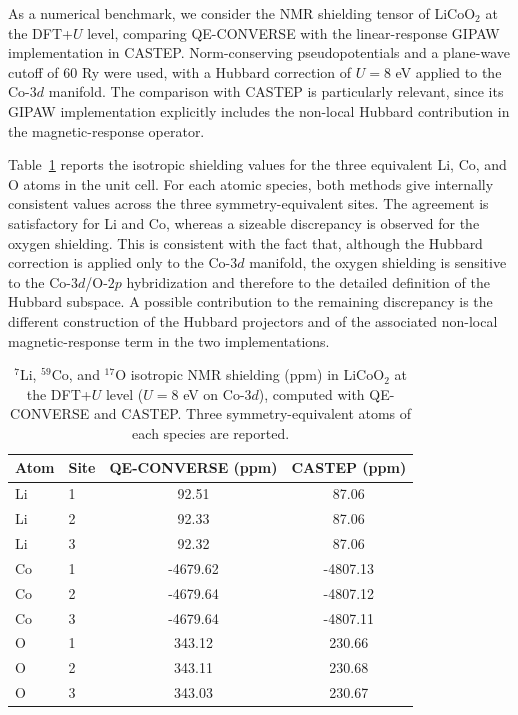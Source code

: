 \documentclass[11pt]{article}
\begin{document}
As a numerical benchmark, we consider the NMR shielding tensor of
LiCoO$_2$ at the DFT+$U$ level, comparing QE-CONVERSE with the
linear-response GIPAW implementation in CASTEP. Norm-conserving
pseudopotentials and a plane-wave cutoff of 60 Ry were used, with a
Hubbard correction of $U=8$ eV applied to the Co-$3d$ manifold. The
comparison with CASTEP is particularly relevant, since its GIPAW
implementation explicitly includes the non-local Hubbard contribution in
the magnetic-response operator.

Table~\ref{tab:licoo2_dftu_shielding} reports the isotropic shielding
values for the three equivalent Li, Co, and O atoms in the unit cell. For
each atomic species, both methods give internally consistent values across
the three symmetry-equivalent sites. The agreement is satisfactory for Li
and Co, whereas a sizeable discrepancy is observed for the oxygen
shielding. This is consistent with the fact that, although the Hubbard
correction is applied only to the Co-$3d$ manifold, the oxygen shielding is
sensitive to the Co-$3d$/O-$2p$ hybridization and therefore to the detailed
definition of the Hubbard subspace. A possible contribution to the
remaining discrepancy is the different construction of the Hubbard
projectors and of the associated non-local magnetic-response term in the
two implementations.
\begin{table}[h]
\centering
\caption{$^{7}$Li, $^{59}$Co, and $^{17}$O isotropic NMR shielding (ppm) in LiCoO$_2$ at the DFT+$U$ level ($U=8$ eV on Co-$3d$), computed with QE-CONVERSE and CASTEP. Three symmetry-equivalent atoms of each species are reported.}
\label{tab:licoo2_dftu_shielding}
\begin{tabular}{llcc}
\hline
Atom & Site & QE-CONVERSE (ppm) & CASTEP (ppm) \\
\hline
Li & 1 & 92.51 & 87.06 \\
Li & 2 & 92.33 & 87.06 \\
Li & 3 & 92.32 & 87.06 \\
\hline
Co & 1 & -4679.62 & -4807.13 \\
Co & 2 & -4679.64 & -4807.12 \\
Co & 3 & -4679.64 & -4807.11 \\
\hline
O & 1 & 343.12 & 230.66 \\
O & 2 & 343.11 & 230.68 \\
O & 3 & 343.03 & 230.67 \\
\hline
\end{tabular}
\end{table}
\end{document}
